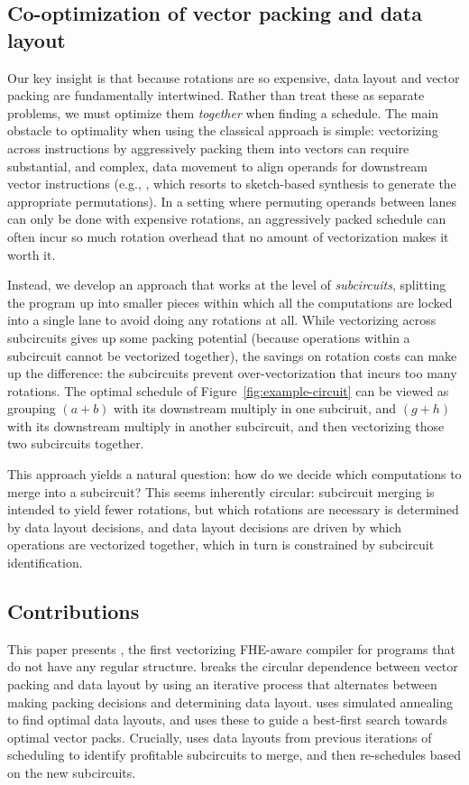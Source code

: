 \subsection*{Co-optimization of vector packing and data layout}
Our key insight is that because rotations are so expensive, data layout and vector packing are fundamentally intertwined. Rather than treat these as separate problems, we must optimize them {\em together} when finding a schedule.
The main obstacle to optimality when using the classical approach is simple: vectorizing across instructions by aggressively packing them into vectors can require substantial, and complex, data movement to align operands for downstream vector instructions (e.g., \citet{SwizzleInventor}, which resorts to sketch-based synthesis to generate the appropriate permutations). In a setting where permuting operands between lanes can only be done with expensive rotations, an aggressively packed schedule can often incur so much rotation overhead that no amount of vectorization makes it worth it.

Instead, we develop an approach that works at the level of {\em subcircuits}, splitting the program up into smaller pieces within which all the computations are locked into a single lane to avoid doing any rotations at all. While vectorizing across subcircuits gives up some packing potential (because operations within a subcircuit cannot be vectorized together), the savings on rotation costs can make up the difference: the subcircuits prevent over-vectorization that incurs too many rotations. The optimal schedule of Figure~\ref{fig:example-circuit} can be viewed as grouping $(a + b)$ with its downstream multiply in one subciruit, and $(g + h)$ with its downstream multiply in another subcircuit, and then vectorizing those two subcircuits together.

This approach yields a natural question: how do we decide which computations to merge into a subcircuit? This seems inherently circular: subcircuit merging is intended to yield fewer rotations, but which rotations are necessary is determined by data layout decisions, and data layout decisions are driven by which operations are vectorized together, which in turn is constrained by subcircuit identification. 


\subsection*{Contributions}

This paper presents \system, the first vectorizing FHE-aware compiler for programs that do not have any regular structure. \system breaks the circular dependence between vector packing and data layout by using an iterative process that alternates between making packing decisions and determining data layout. \system uses simulated annealing to find optimal data layouts, and uses these to guide a best-first search towards optimal vector packs. Crucially, \system uses data layouts from previous iterations of scheduling to identify profitable subcircuits to merge, and then re-schedules based on the new subcircuits.



